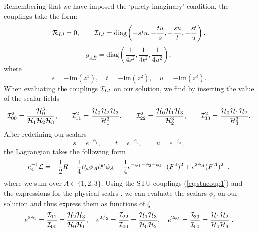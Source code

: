 Remembering that we have imposed the `purely imaginary' condition, the couplings take the form:
\begin{equation}
\label{eq:stucoup1}
 {\cal R}_{IJ} = 0, \qquad  {\cal I}_{IJ} = \text{diag}\left( - s t u, -\frac{ t u}{s}, -\frac{s u}{t}, -\frac{ s t}{u} \right),
 \end{equation}
 \begin{equation}
 \label{eq:stucoup2}
 g_{A\bar{B}} = \text{diag}\left( \dfrac{1}{4s^2}, \dfrac{1}{4t^2}, \dfrac{1}{4u^2}\right),
\end{equation}
where
\begin{equation*}
 s = -\text{Im}(z^1) , \quad t = -\text{Im}(z^2), \quad u = -\text{Im}(z^3) .
\end{equation*}
When evaluating the couplings ${\cal I}_{IJ}$ on our solution, we find by inserting the value of the scalar fields 
\begin{equation}
\label{eq:iij_coupling}	
    {\cal I}_{00}^2 = \frac{{\cal H}_0^3}{{\cal H}_1 {\cal H}_2 {\cal H}_3}, \qquad {\cal I}_{11}^2 = \frac{{\cal H}_0 {\cal H}_2 {\cal H}_3}{{\cal H}_1^3}, \qquad {\cal I}_{22}^2 = \frac{{\cal H}_0 {\cal H}_1 {\cal H}_3}{{\cal H}_2^3}, \qquad {\cal I}_{33}^2 = \frac{{\cal H}_0 {\cal H}_1 {\cal H}_2}{{\cal H}_3^3}.
\end{equation}
After redefining our scalars
\begin{equation}
 s = e^{-\phi_1}, \qquad t = e^{-\phi_2}, \qquad u = e^{-\phi_3},
\end{equation}
the Lagrangian takes the following form
\begin{equation}
\label{eq:stulag}
 \begin{aligned}
 e_4^{-1} {\cal L} = -\frac{1}{2}R - \frac{1}{4} \partial_\mu \phi_A \partial^\mu \phi_A
 - \frac{1}{4} e^{-\phi_1 - \phi_2 - \phi_3} \left[ (F^0)^2 + e^{2 \phi_A } (F^A)^2 \right] ,
 \end{aligned}
\end{equation}
\noindent where we sum over $A \in \{1,2,3\}$. Using the STU couplings (\ref{eq:stucoup1}) and the expressions for the physical scalrs , we can evaluate the scalars $\phi_i$ on our solution and thus express them
as functions of $\zeta$
\begin{equation*}
    e^{2\phi_1} = \frac{{\cal I}_{11}}{{\cal I}_{00}} = \frac{{\cal H}_2 {\cal H}_3}{{\cal H}_0 {\cal H}_1}
    , \quad e^{2\phi_2} = \frac{{\cal I}_{22}}{{\cal I}_{00}} = \frac{{\cal H}_1 {\cal H}_3}{{\cal H}_0 {\cal H}_2}
    , \quad e^{2\phi_3} = \frac{{\cal I}_{33}}{{\cal I}_{00}} =\frac{{\cal H}_1 {\cal H}_2}{{\cal H}_0 {\cal H}_3} \;.
\end{equation*}


